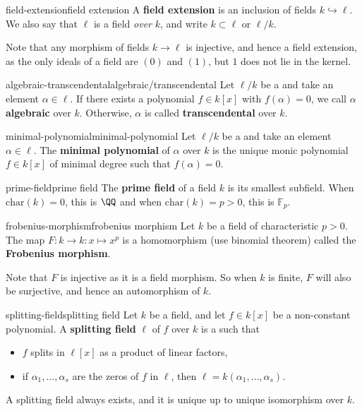 \begin{topic}{field-extension}{field extension}
    A \textbf{field extension} is an inclusion of fields $k \hookrightarrow \ell$. We also say that $\ell$ is a field \textit{over} $k$, and write $k \subset \ell$ or $\ell / k$.
    
    Note that any morphism of fields $k \to \ell$ is injective, and hence a field extension, as the only ideals of a field are $(0)$ and $(1)$, but $1$ does not lie in the kernel.
\end{topic}

\begin{topic}{algebraic-transcendental}{algebraic/transcendental}
    Let $\ell / k$ be a  and take an element $\alpha \in \ell$. If there exists a polynomial $f \in k[x]$ with $f(\alpha) = 0$, we call $\alpha$ \textbf{algebraic} over $k$. Otherwise, $\alpha$ is called \textbf{transcendental} over $k$.
\end{topic}

\begin{topic}{minimal-polynomial}{minimal-polynomial}
    Let $\ell / k$ be a  and take an  element $\alpha \in \ell$. The \textbf{minimal polynomial} of $\alpha$ over $k$ is the unique monic polynomial $f \in k[x]$ of minimal degree such that $f(\alpha) = 0$.
\end{topic}

\begin{topic}{prime-field}{prime field}
    The \textbf{prime field} of a field $k$ is its smallest subfield. When $\text{char}(k) = 0$, this is $\QQ$ and when $\text{char}(k) = p > 0$, this is $\mathbb{F}_p$.
\end{topic}

\begin{topic}{frobenius-morphism}{frobenius morphism}
    Let $k$ be a field of characteristic $p > 0$. The map $F : k \to k : x \mapsto x^p$ is a homomorphism (use binomial theorem) called the \textbf{Frobenius morphism}.
    
    Note that $F$ is injective as it is a field morphism. So when $k$ is finite, $F$ will also be surjective, and hence an automorphism of $k$. 
\end{topic}

\begin{topic}{splitting-field}{splitting field}
    Let $k$ be a field, and let $f \in k[x]$ be a non-constant polynomial. A \textbf{splitting field} $\ell$ of $f$ over $k$ is a  such that
    \begin{itemize}
        \item $f$ splits in $\ell[x]$ as a product of linear factors,
        \item if $\alpha_1, \ldots, \alpha_s$ are the zeros of $f$ in $\ell$, then $\ell = k(\alpha_1, \ldots, \alpha_s)$.
    \end{itemize}
    A splitting field always exists, and it is unique up to unique isomorphism over $k$.
\end{topic}

